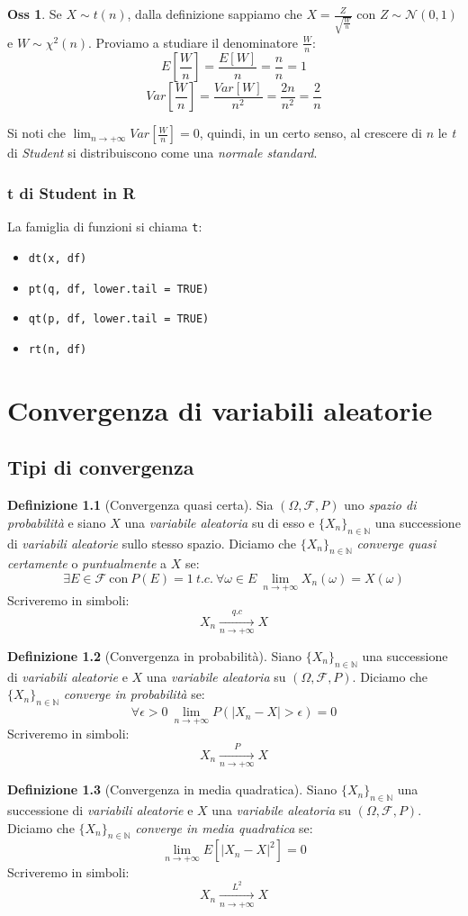 \documentclass[12pt, a4paper]{report}
\theoremstyle{definition}
\newtheorem{definition}{Definizione}[section]
\newtheorem*{observation}{Oss}
\DeclareRobustCommand{\F}{\mathcal{F}}%
\DeclareRobustCommand{\N}{\mathbb{N}}%
\DeclareRobustCommand{\probspace}{(\Omega,\F,P)}
\DeclareRobustCommand{\norm}{\mathcal{N}}
\newcommand\conv[2]{\xrightarrow[#2\to +\infty]{#1}}
\begin{document}
\begin{observation}
	Se \(X\sim t(n)\), dalla definizione sappiamo che \(X=\frac{Z}{\sqrt{\frac{W}{n}}}\)
	con $Z\sim\norm(0,1)$ e $W\sim\chi^2(n)$. Proviamo a studiare il denominatore
	\(\frac{W}{n}\):
	\[E\left[\frac{W}{n}\right]=\frac{E[W]}{n}=\frac{n}{n}=1\]
	\[Var\left[\frac{W}{n}\right]=\frac{Var[W]}{n^2}=\frac{2n}{n^2}=\frac{2}{n}\]
	
	Si noti che \(\lim_{n\to +\infty}Var[\frac{W}{n}]=0\), quindi, in un certo
	senso, al crescere di $n$ le \emph{t} di \emph{Student} si distribuiscono
	come una \emph{normale standard}.
\end{observation}

\subsection{t di Student in R}
La famiglia di funzioni si chiama \texttt{t}:
\begin{itemize}
	\item \texttt{dt(x, df)}
	\item \texttt{pt(q, df, lower.tail = TRUE)}
	\item \texttt{qt(p, df, lower.tail = TRUE)}
	\item \texttt{rt(n, df)}
\end{itemize}

\chapter{Convergenza di variabili aleatorie}

\section{Tipi di convergenza}
\begin{definition}[Convergenza quasi certa]
	Sia $\probspace$ uno \emph{spazio di probabilità} e siano $X$ una
	\emph{variabile aleatoria} su di esso e \(\{X_n\}_{n\in\N}\) una successione
	di \emph{variabili aleatorie} sullo stesso spazio. Diciamo che \(\{X_n\}_{n\in\N}\)
	\emph{converge quasi certamente} o \emph{puntualmente} a $X$ se:
	\[\exists E\in\F\ \text{con}\ P(E)=1\ t.c.\ \forall\omega\in E\ \lim_{n\to
	+\infty}X_n(\omega)=X(\omega)\]
	Scriveremo in simboli:
	\[X_n\conv{q.c}{n}X\]
\end{definition}
\begin{definition}[Convergenza in probabilità]
	Siano \(\{X_n\}_{n\in\N}\) una successione di \emph{variabili aleatorie} e
	$X$ una \emph{variabile aleatoria} su $\probspace$. Diciamo che \(\{X_n\}_
	{n\in\N}\) \emph{converge in probabilità} se:
	\[\forall\epsilon>0\ \lim_{n\to +\infty}P(|X_n-X|>\epsilon)=0\]
	Scriveremo in simboli:
	\[X_n\conv{P}{n}X\]
\end{definition}
\begin{definition}[Convergenza in media quadratica]
	Siano \(\{X_n\}_{n\in\N}\) una successione di \emph{variabili aleatorie} e
	$X$ una \emph{variabile aleatoria} su $\probspace$. Diciamo che \(\{X_n\}_
	{n\in\N}\) \emph{converge in media quadratica} se:
	\[\lim_{n\to +\infty}E\left[|X_n-X|^2\right]=0\]
	Scriveremo in simboli:
	\[X_n\conv{L^2}{n}X\]
\end{definition}
\end{document}
